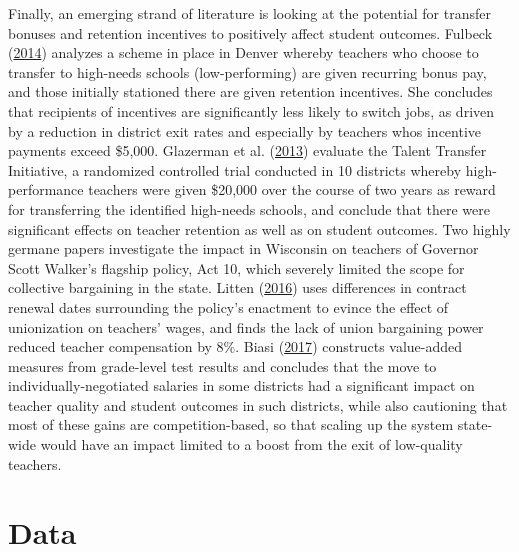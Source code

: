 \documentclass[12pt,]{article}
\begin{document}
Finally, an emerging strand of literature is looking at the potential
for transfer bonuses and retention incentives to positively affect
student outcomes. Fulbeck (\protect\hyperlink{ref-fulbeck}{2014})
analyzes a scheme in place in Denver whereby teachers who choose to
transfer to high-needs schools (low-performing) are given recurring
bonus pay, and those initially stationed there are given retention
incentives. She concludes that recipients of incentives are
significantly less likely to switch jobs, as driven by a reduction in
district exit rates and especially by teachers whos incentive payments
exceed \$5,000. Glazerman et al.
(\protect\hyperlink{ref-glazerman}{2013}) evaluate the Talent Transfer
Initiative, a randomized controlled trial conducted in 10 districts
whereby high-performance teachers were given \$20,000 over the course of
two years as reward for transferring the identified high-needs schools,
and conclude that there were significant effects on teacher retention as
well as on student outcomes. Two highly germane papers investigate the
impact in Wisconsin on teachers of Governor Scott Walker's flagship
policy, Act 10, which severely limited the scope for collective
bargaining in the state. Litten (\protect\hyperlink{ref-litten}{2016})
uses differences in contract renewal dates surrounding the policy's
enactment to evince the effect of unionization on teachers' wages, and
finds the lack of union bargaining power reduced teacher compensation by
8\%. Biasi (\protect\hyperlink{ref-biasi}{2017}) constructs value-added
measures from grade-level test results and concludes that the move to
individually-negotiated salaries in some districts had a significant
impact on teacher quality and student outcomes in such districts, while
also cautioning that most of these gains are competition-based, so that
scaling up the system state-wide would have an impact limited to a boost
from the exit of low-quality teachers.

\section{Data}\label{data}
\end{document}
